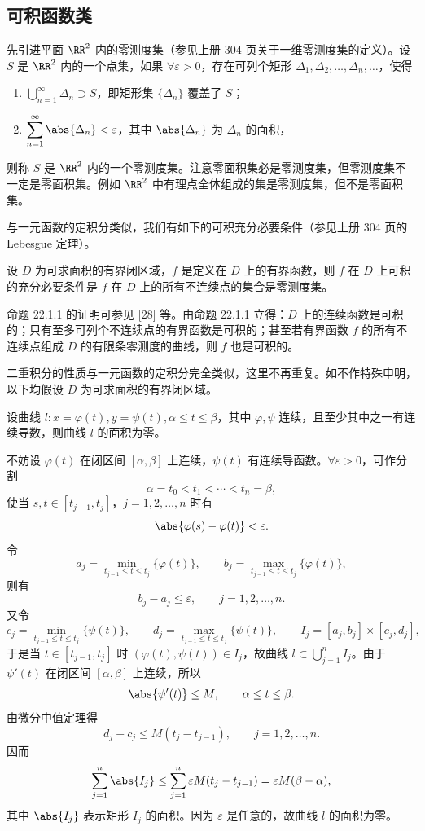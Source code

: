 \subsection{可积函数类}

先引进平面 $\RR^2$ 内的零测度集（参见上册 304 页关于一维零测度集的定义）。设 $S$ 是 $\RR^2$ 内的一个点集，如果 $\forall\varepsilon>0$，存在可列个矩形 $\Delta_1,\Delta_2,\ldots,\Delta_n,\ldots$，使得
\begin{enumerate}[label=(\arabic*)]
  \item $\displaystyle\bigcup_{n=1}^{\infty}\Delta_n\supset S$，即矩形集 $\{\Delta_n\}$ 覆盖了 $S$；
  \item $\displaystyle\sum_{n=1}^{\infty}\abs{\Delta_n}<\varepsilon$，其中 $\abs{\Delta_n}$ 为 $\Delta_n$ 的面积，
\end{enumerate}
则称 $S$ 是 $\RR^2$ 内的一个零测度集。注意零面积集必是零测度集，但零测度集不一定是零面积集。例如 $\RR^2$ 中有理点全体组成的集是零测度集，但不是零面积集。

与一元函数的定积分类似，我们有如下的可积充分必要条件（参见上册 304 页的 Lebesgue 定理）。

\begin{xproposition}[22.1.1]
设 $D$ 为可求面积的有界闭区域，$f$ 是定义在 $D$ 上的有界函数，则 $f$ 在 $D$ 上可积的充分必要条件是 $f$ 在 $D$ 上的所有不连续点的集合是零测度集。
\end{xproposition}

命题 22.1.1 的证明可参见 [28] 等。由命题 22.1.1 立得：$D$ 上的连续函数是可积的；只有至多可列个不连续点的有界函数是可积的；甚至若有界函数 $f$ 的所有不连续点组成 $D$ 的有限条零测度的曲线，则 $f$ 也是可积的。

二重积分的性质与一元函数的定积分完全类似，这里不再重复。如不作特殊申明，以下均假设 $D$ 为可求面积的有界闭区域。

\begin{xexample}[22.1.1]
设曲线 $l\colon x=\varphi(t),y=\psi(t),\alpha\le t\le\beta$，其中 $\varphi,\psi$ 连续，且至少其中之一有连续导数，则曲线 $l$ 的面积为零。
\end{xexample}
\begin{xproof}
不妨设 $\varphi(t)$ 在闭区间 $[\alpha,\beta]$ 上连续，$\psi(t)$ 有连续导函数。$\forall\varepsilon>0$，可作分割
\[
  \alpha=t_0<t_1<\cdots<t_n=\beta,
\]
使当 $s,t\in[t_{j-1},t_j]$，$j=1,2,\ldots,n$ 时有
\[
  \abs{\varphi(s)-\varphi(t)}<\varepsilon.
\]
令
\[
  a_j=\min_{t_{j-1}\le t\le t_j}\{\varphi(t)\},\qquad
  b_j=\max_{t_{j-1}\le t\le t_j}\{\varphi(t)\},
\]
则有
\[
  b_j-a_j\le\varepsilon,\qquad j=1,2,\ldots,n.
\]
又令
\[
  c_j=\min_{t_{j-1}\le t\le t_j}\{\psi(t)\},\qquad
  d_j=\max_{t_{j-1}\le t\le t_j}\{\psi(t)\},\qquad
  I_j=[a_j,b_j]\times[c_j,d_j],
\]
于是当 $t\in[t_{j-1},t_j]$ 时 $(\varphi(t),\psi(t))\in I_j$，故曲线 $l\subset\bigcup_{j=1}^n I_j$。由于 $\psi'(t)$ 在闭区间 $[\alpha,\beta]$ 上连续，所以
\[
  \abs{\psi'(t)}\le M,\qquad \alpha\le t\le\beta.
\]
由微分中值定理得
\[
  d_j-c_j\le M(t_j-t_{j-1}),\qquad j=1,2,\ldots,n.
\]
因而
\[
  \sum_{j=1}^n\abs{I_j}
  \le\sum_{j=1}^n\varepsilon M(t_j-t_{j-1})
  =\varepsilon M(\beta-\alpha),
\]
其中 $\abs{I_j}$ 表示矩形 $I_j$ 的面积。因为 $\varepsilon$ 是任意的，故曲线 $l$ 的面积为零。
\end{xproof}

